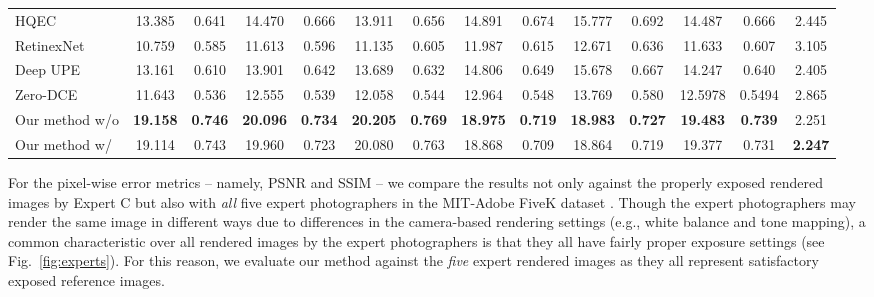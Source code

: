 \documentclass[final]{cvpr}
\begin{document}
\begin{table*}
\begin{center}
{\begin{tabular}{|l|c|c|c|c|c|c|c|c|c|c|c|c|c|}
\cellcolor[HTML]{D5D5D5}HQEC \cite{HQEC} & 13.385 & 0.641 & 14.470 & 0.666 & 13.911 & 0.656 & 14.891 & 0.674 & 15.777 & 0.692 & 14.487 & 0.666 & 2.445\\
\cellcolor[HTML]{D5D5D5}RetinexNet \cite{Chen2018Retinex}  & 10.759 & 0.585 & 11.613 & 0.596 & 11.135 & 0.605 & 11.987 & 0.615 & 12.671 & 0.636 & 11.633 & 0.607 & 3.105\\
\cellcolor[HTML]{D5D5D5}Deep UPE \cite{DeepUPE} & 13.161 & 0.610 & 13.901 & 0.642 & 13.689 & 0.632 & 14.806 & 0.649 & 15.678 & 0.667 & 14.247 & 0.640  & 2.405\\ 
\cellcolor[HTML]{D5D5D5}Zero-DCE \cite{guo2020zero}  & 11.643  & 0.536 & 12.555 & 0.539 & 12.058 & 0.544 & 12.964  & 0.548 & 13.769 & 0.580 & 12.5978 & 0.5494 & 2.865 \\
\hdashline
Our method w/o  & \cellcolor[HTML]{79CC7A}\textbf{19.158} & \cellcolor[HTML]{79CC7A}\textbf{0.746} &  \cellcolor[HTML]{79CC7A}\textbf{20.096} & \cellcolor[HTML]{79CC7A}\textbf{0.734} & \cellcolor[HTML]{79CC7A}\textbf{20.205} & \cellcolor[HTML]{79CC7A}\textbf{0.769} & \cellcolor[HTML]{79CC7A}\textbf{18.975} & \cellcolor[HTML]{79CC7A}\textbf{0.719} & \cellcolor[HTML]{79CC7A}\textbf{18.983} & \cellcolor[HTML]{79CC7A}\textbf{0.727} & \cellcolor[HTML]{79CC7A}\textbf{19.483} & \cellcolor[HTML]{79CC7A}\textbf{0.739} & \cellcolor[HTML]{FFFBA3}2.251\\
Our method w/  & \cellcolor[HTML]{FFFBA3}19.114 & \cellcolor[HTML]{FFFBA3}0.743 & \cellcolor[HTML]{FFFBA3}19.960 & \cellcolor[HTML]{FFFBA3}0.723 & \cellcolor[HTML]{FFFBA3}20.080 & \cellcolor[HTML]{FFFBA3}0.763 & \cellcolor[HTML]{FFFBA3}18.868 & \cellcolor[HTML]{FFFBA3}0.709 & \cellcolor[HTML]{FFFBA3}18.864 & \cellcolor[HTML]{FFFBA3}0.719 & \cellcolor[HTML]{FFFBA3}19.377 & \cellcolor[HTML]{FFFBA3}0.731 & \cellcolor[HTML]{79CC7A}\textbf{2.247} \\\hline
\end{tabular}
}\end{center}
\vspace{-6mm}
\end{table*}




For the pixel-wise error metrics -- namely, PSNR and SSIM -- we compare the results not only against the properly exposed rendered images by Expert C but also with \textit{all} five expert photographers in the MIT-Adobe FiveK dataset \cite{fivek}. Though the expert photographers may render the same image in different ways due to differences in the camera-based rendering settings (e.g., white balance and tone mapping), a common characteristic over all rendered images by the expert photographers is that they all have fairly proper exposure settings \cite{fivek} (see Fig.~\ref{fig:experts}). For this reason, we evaluate our method against the \textit{five} expert rendered images as they all represent satisfactory exposed reference images.
\end{document}
